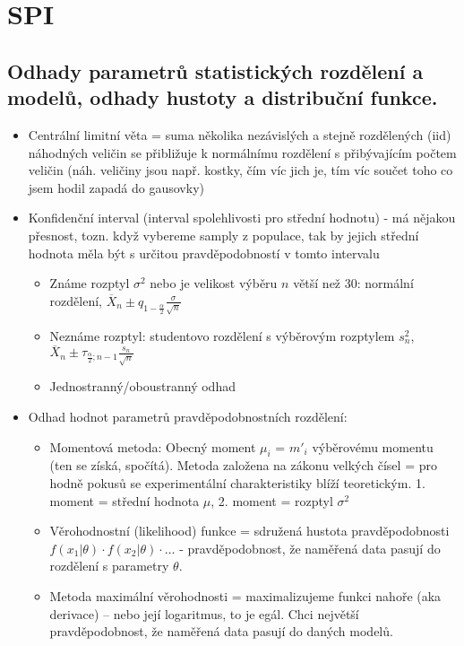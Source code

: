 \documentclass[a4paper,hidelinks]{article}
\begin{document}
\section{SPI}

\subsection{Odhady parametrů statistických rozdělení a modelů, odhady hustoty a distribuční funkce.}

\begin{itemize}
    \item Centrální limitní věta = suma několika nezávislých a stejně rozdělených (iid) náhodných veličin se přibližuje k normálnímu rozdělení s přibývajícím počtem veličin (náh. veličiny jsou např. kostky, čím víc jich je, tím víc součet toho co jsem hodil zapadá do gausovky)
    \item Konfidenční interval (interval spolehlivosti pro střední hodnotu) - má nějakou přesnost, tozn. když vybereme samply z populace, tak by jejich střední hodnota měla být s určitou pravděpodobností v tomto intervalu
    \begin{itemize}
        \item Známe rozptyl $\sigma^2$ nebo je velikost výběru $n$ větší než 30: normální rozdělení, $\overline{X}_n\pm q_{1-\frac{\alpha}{2}}\frac{\sigma}{\sqrt{n}}$
        \item Neznáme rozptyl: studentovo rozdělení s výběrovým rozptylem $s_n^2$, $\overline{X}_n\pm \tau_{\frac{\alpha}{2};n-1}\frac{s_n}{\sqrt{n}}$
        \item Jednostranný/oboustranný odhad
    \end{itemize}
    \item Odhad hodnot parametrů pravděpodobnostních rozdělení:
    \begin{itemize}
        \item Momentová metoda: Obecný moment $\mu_i$ = $m'_i$ výběrovému momentu (ten se získá, spočítá). Metoda založena na zákonu velkých čísel = pro hodně pokusů se experimentální charakteristiky blíží teoretickým. 1. moment = střední hodnota $\mu$, 2. moment = rozptyl $\sigma^2$
        \item Věrohodnostní (likelihood) funkce = sdružená hustota pravděpodobnosti $f(x_1|\theta) \cdot f(x_2|\theta) \cdot \ldots$ - pravděpodobnost, že naměřená data pasují do rozdělení s parametry $\theta$.
        \item Metoda maximální věrohodnosti = maximalizujeme funkci nahoře (aka derivace) -- nebo její logaritmus, to je egál. Chci největší pravděpodobnost, že naměřená data pasují do daných modelů.

\end{itemize}
\end{itemize}
\end{document}

